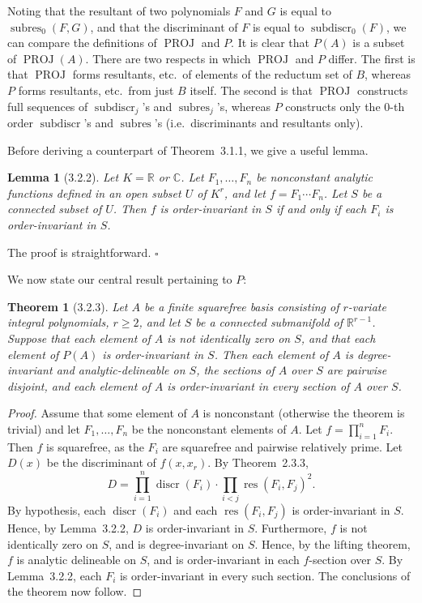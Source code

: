 \documentclass[11pt]{article}
\theoremstyle{plain}
\newtheorem*{theorem*}{Theorem}
\newtheorem*{lemma*}{Lemma}
\theoremstyle{definition}
\newcommand{\R}{\mathbb{R}}
\newcommand{\C}{\mathbb{C}}
\DeclareMathOperator{\res}{res}
\DeclareMathOperator{\discr}{discr}
\DeclareMathOperator{\subres}{subres}
\DeclareMathOperator{\subdiscr}{subdiscr}
\DeclareMathOperator{\PROJ}{PROJ}
\begin{document}
Noting that the resultant of two polynomials $F$ and $G$ is equal to
$\subres_0(F, G)$, and that the discriminant of $F$ is equal to
$\subdiscr_0(F)$, we can compare the definitions of $\PROJ$ and $P$.
It is clear that $P(A)$ is a subset of $\PROJ(A)$. There are two
respects in which $\PROJ$ and $P$ differ. The first is that $\PROJ$
forms resultants, etc.\ of elements of the reductum set of $B$, whereas
$P$ forms resultants, etc.\ from just $B$ itself. The second is that
$\PROJ$ constructs full sequences of $\subdiscr_j$'s and
$\subres_j$'s, whereas $P$ constructs only the 0-th order $\subdiscr$'s
and $\subres$'s (i.e.\ discriminants and resultants only).

Before deriving a counterpart of Theorem~3.1.1, we give a useful lemma.

\begin{lemma*}[3.2.2]
Let $K = \R$ or $\C$. Let $F_1, \ldots, F_n$ be nonconstant analytic
functions defined in an open subset $U$ of $K^r$, and let
$f = F_1 \cdots F_n$. Let $S$ be a connected subset of $U$. Then $f$
is order-invariant in $S$ if and only if each $F_i$ is order-invariant
in $S$.
\end{lemma*}

The proof is straightforward. $\square$

We now state our central result pertaining to $P$:

\begin{theorem*}[3.2.3]
Let $A$ be a finite squarefree basis consisting of $r$-variate integral
polynomials, $r \ge 2$, and let $S$ be a connected submanifold of
$\R^{r-1}$. Suppose that each element of $A$ is not identically zero
on $S$, and that each element of $P(A)$ is order-invariant in $S$.
Then each element of $A$ is degree-invariant and analytic-delineable
on $S$, the sections of $A$ over $S$ are pairwise disjoint, and each
element of $A$ is order-invariant in every section of $A$ over $S$.
\end{theorem*}

\begin{proof}
Assume that some element of $A$ is nonconstant (otherwise the theorem
is trivial) and let $F_1, \ldots, F_n$ be the nonconstant elements of
$A$. Let $f = \prod_{i=1}^{n} F_i$. Then $f$ is squarefree, as the
$F_i$ are squarefree and pairwise relatively prime. Let $D(x)$ be the
discriminant of $f(x, x_r)$. By Theorem~2.3.3,
\[
D = \prod_{i=1}^{n} \discr(F_i) \cdot \prod_{i < j} \res(F_i, F_j)^2.
\]
By hypothesis, each $\discr(F_i)$ and each $\res(F_i, F_j)$ is
order-invariant in $S$. Hence, by Lemma~3.2.2, $D$ is order-invariant
in $S$. Furthermore, $f$ is not identically zero on $S$, and is
degree-invariant on $S$. Hence, by the lifting theorem, $f$ is analytic
delineable on $S$, and is order-invariant in each $f$-section over $S$.
By Lemma~3.2.2, each $F_i$ is order-invariant in every such section.
The conclusions of the theorem now follow.
\end{proof}
\end{document}
